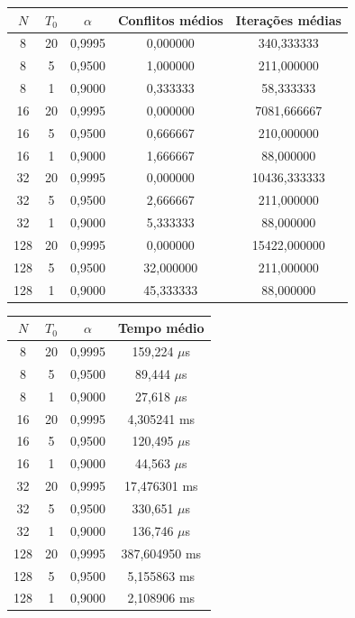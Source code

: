 \documentclass[12pt,a4paper]{article}
\begin{document}
\begin{center}
\begin{tabular}{ccccc}
\toprule
$N$ & $T_0$ & $\alpha$ & Conflitos médios & Iterações médias \\
\midrule
8   & 20 & 0{,}9995 & 0{,}000000  & 340{,}333333 \\
8   & 5  & 0{,}9500 & 1{,}000000  & 211{,}000000 \\
8   & 1  & 0{,}9000 & 0{,}333333  & 58{,}333333 \\
\midrule
16  & 20 & 0{,}9995 & 0{,}000000  & 7081{,}666667 \\
16  & 5  & 0{,}9500 & 0{,}666667  & 210{,}000000 \\
16  & 1  & 0{,}9000 & 1{,}666667  & 88{,}000000 \\
\midrule
32  & 20 & 0{,}9995 & 0{,}000000  & 10436{,}333333 \\
32  & 5  & 0{,}9500 & 2{,}666667  & 211{,}000000 \\
32  & 1  & 0{,}9000 & 5{,}333333  & 88{,}000000 \\
\midrule
128 & 20 & 0{,}9995 & 0{,}000000  & 15422{,}000000 \\
128 & 5  & 0{,}9500 & 32{,}000000 & 211{,}000000 \\
128 & 1  & 0{,}9000 & 45{,}333333 & 88{,}000000 \\
\bottomrule
\end{tabular}
\end{center}

\begin{center}
\begin{tabular}{cccc}
\toprule
$N$ & $T_0$ & $\alpha$ & Tempo médio \\
\midrule
8   & 20 & 0{,}9995 & 159{,}224 $\mu$s \\
8   & 5  & 0{,}9500 & 89{,}444 $\mu$s \\
8   & 1  & 0{,}9000 & 27{,}618 $\mu$s \\
16  & 20 & 0{,}9995 & 4{,}305241 ms \\
16  & 5  & 0{,}9500 & 120{,}495 $\mu$s \\
16  & 1  & 0{,}9000 & 44{,}563 $\mu$s \\
32  & 20 & 0{,}9995 & 17{,}476301 ms \\
32  & 5  & 0{,}9500 & 330{,}651 $\mu$s \\
32  & 1  & 0{,}9000 & 136{,}746 $\mu$s \\
128 & 20 & 0{,}9995 & 387{,}604950 ms \\
128 & 5  & 0{,}9500 & 5{,}155863 ms \\
128 & 1  & 0{,}9000 & 2{,}108906 ms \\
\bottomrule
\end{tabular}
\end{center}
\end{document}
